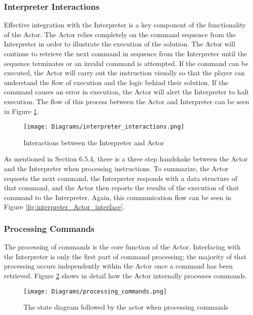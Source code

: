 \subsubsection{Interpreter Interactions}
Effective integration with the Interpreter is a key component of the functionality of the Actor. The Actor relies completely on the command sequence from the Interpreter in order to illustrate the execution of the solution. The Actor will continue to retrieve the next command in sequence from the Interpreter until the sequence terminates or an invalid command is attempted. If the command can be executed, the Actor will carry out the instruction visually so that the player can understand the flow of execution and the logic behind their solution. If the command causes an error in execution, the Actor will alert the Interpreter to halt execution. The flow of this process between the Actor and Interpreter can be seen in Figure \ref{fig:interpreter_interactions}.\\

\begin{figure}[!htb]
  \caption{Interactions between the Interpreter and Actor}
  \label{fig:interpreter_interactions}
  \centering
  \texttt{[image: Diagrams/interpreter\_interactions.png]}
\end{figure}

As mentioned in Section 6.5.4, there is a three step handshake between the Actor and the Interpreter when processing instructions. To summarize, the Actor requests the next command, the Interpreter responds with a data structure of that command, and the Actor then reports the results of the execution of that command to the Interpreter. Again, this communication flow can be seen in Figure \ref{fig:interpreter_Actor_interface}. 

\subsubsection{Processing Commands}
The processing of commands is the core function of the Actor. Interfacing with the Interpreter is only the first part of command processing; the majority of that processing occurs independently within the Actor once a command has been retrieved. Figure \ref{fig:processing_commands} shows in detail how the Actor internally processes commands.\\

\begin{figure}[!htb]
  \caption{The state diagram followed by the actor when processing commands}
  \label{fig:processing_commands}
  \centering
  \texttt{[image: Diagrams/processing\_commands.png]}
\end{figure}

